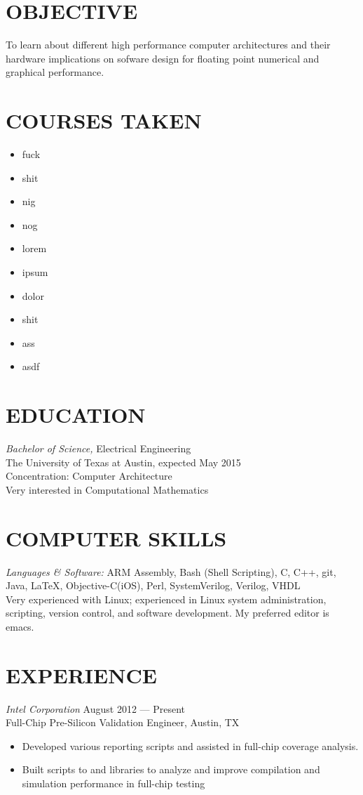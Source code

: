 \documentclass[margin]{res}
\begin{document}
\begin{resume}
  \section{OBJECTIVE} 
  To learn about different high performance computer architectures and
  their hardware implications on sofware design for floating point
  numerical and graphical performance.
  \section{COURSES TAKEN}
  \begin{multicols}{4}
    \begin{itemize}
    \item fuck
    \item shit
    \item nig
    \item nog
    \item lorem
    \item ipsum
    \item dolor
    \item shit
    \item ass
    \item asdf
    \end{itemize}
  \end{multicols}
  \section{EDUCATION} 
  {\sl Bachelor of Science,} Electrical Engineering \\
  The University of Texas at Austin,
  expected May 2015 \\
  Concentration: Computer Architecture \\
  Very interested in Computational Mathematics

  \section{COMPUTER SKILLS} 
  {\sl Languages \& Software:} 
  ARM Assembly, Bash (Shell Scripting), C, C++, git, Java, \LaTeX,
  \mbox{Objective-C(iOS)}, Perl, SystemVerilog, Verilog, VHDL 
  \vspace{1.0em}\\
  Very experienced with Linux; experienced in Linux system
  administration, scripting, version control, and software
  development. My preferred editor is emacs.

  \section{EXPERIENCE} {\sl Intel Corporation} 
  \hfill August 2012 --- Present \\
  Full-Chip Pre-Silicon Validation Engineer, Austin, TX
  \begin{itemize}
  \item Developed various reporting scripts and assisted in full-chip
    coverage analysis.
  \item Built scripts to and libraries to analyze and improve
    compilation and simulation performance in full-chip testing
  \end{itemize}


\end{resume}
\end{document}
